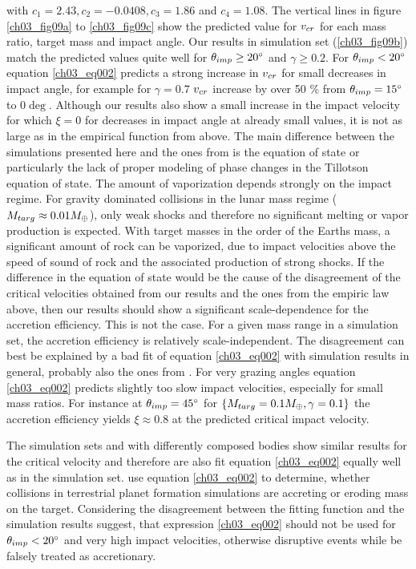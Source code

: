 with $c_1 = 2.43, c_2 = - 0.0408, c_3 = 1.86$ and $c_4 = 1.08$. The vertical lines in figure \ref{ch03_fig09a} to \ref{ch03_fig09c} show the predicted value for $v_{cr}$ for each mass ratio, target mass and impact angle. Our results in simulation set \css (\ref{ch03_fig09b}) match the predicted values quite well for $\theta_{imp} \ge 20 ^\circ$ and $\gamma \ge 0.2$. For $\theta_{imp} < 20 ^\circ$ equation \ref{ch03_eq002} predicts a strong increase in $v_{cr}$ for small decreases in impact angle, for example for $\gamma = 0.7$ $v_{cr}$ increase by over 50 \% from $\theta_{imp} = 15 ^\circ$ to $0 \deg$. Although our results also show a small increase in the impact velocity for which $\xi = 0$ for decreases in impact angle at already small values, it is not as large as in the empirical function from above. The main difference between the simulations presented here and the ones from \cite{2010ApJ...714L..21K} is the equation of state or particularly the lack of proper modeling of phase changes in the Tillotson equation of state. The amount of vaporization depends strongly on the impact regime. For gravity dominated collisions in the lunar mass regime ($M_{targ} \approx 0.01 M_{\oplus}$), only weak shocks and therefore no significant melting or vapor production is expected. With target masses in the order of the Earths mass, a significant amount of rock can be vaporized, due to impact velocities above the speed of sound of rock and the associated production of strong shocks. If the difference in the equation of state would be the cause of the disagreement of the critical velocities obtained from our results and the ones from the empiric law above, then our results should show a significant scale-dependence for the accretion efficiency. This is not the case. For a given mass range in a simulation set, the accretion efficiency is relatively scale-independent. The disagreement can best be explained by a  bad fit of equation \ref{ch03_eq002} with simulation results in general, probably also the ones from \cite{2010ApJ...714L..21K}. For very grazing angles equation \ref{ch03_eq002} predicts slightly too slow impact velocities, especially for small mass ratios. For instance at $\theta_{imp} = 45 ^\circ$ for $\{ M_{targ} = 0.1 M_{\oplus}, \gamma = 0.1\}$ the accretion efficiency yields $\xi \approx 0.8$ at the predicted critical impact velocity.

The simulation sets \iss and \rss with differently composed bodies show similar results for the critical velocity and therefore are also fit equation \ref{ch03_eq002} equally well as in the \css simulation set. \cite{2010ApJ...714L..21K} use equation \ref{ch03_eq002} to determine, whether collisions in terrestrial planet formation simulations are accreting or eroding mass on the target. Considering the disagreement between the fitting function and the simulation results suggest, that expression \ref{ch03_eq002} should not be used for $\theta_{imp} < 20 ^\circ$ and very high impact velocities, otherwise disruptive events while be falsely treated as accretionary.

